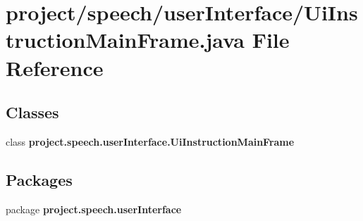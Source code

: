 \section{project/speech/user\+Interface/\+Ui\+Instruction\+Main\+Frame.java File Reference}
\label{_ui_instruction_main_frame_8java}
\subsection*{Classes}
\begin{DoxyCompactItemize}
\item 
class {\bf project.\+speech.\+user\+Interface.\+Ui\+Instruction\+Main\+Frame}
\end{DoxyCompactItemize}
\subsection*{Packages}
\begin{DoxyCompactItemize}
\item 
package {\bf project.\+speech.\+user\+Interface}
\end{DoxyCompactItemize}
